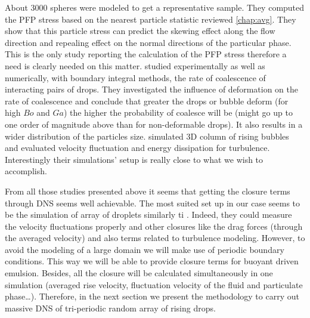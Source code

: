 About 3000 spheres were modeled to get a representative sample. 
They computed the PFP stress based on the nearest particle statistic reviewed \ref{chap:avg}.
They show that this particle stress can predict the skewing effect along the flow direction and repealing effect on the normal directions of the particular phase. 
This is the only study reporting the calculation of the PFP stress therefore a need is clearly needed on this matter.
\citet{manga1995collective} studied experimentally as well as numerically, with boundary integral methods, the rate of coalescence of interacting pairs of drops.
They investigated the influence of deformation on the rate of coalescence and conclude that greater the drops or bubble deform (for high $Bo$ and  $Ga$) the higher the probability of coalesce will be (might go up to one order of magnitude above than for non-deformable drops).
It also results in a wider distribution of the particles size.
\citet{innocenti2020direct} simulated 3D column of rising bubbles and evaluated velocity fluctuation and energy dissipation for turbulence. 
Interestingly their simulations'  setup is really close to what we wish to accomplish. 


From all those studies presented above it seems that getting the closure terms through DNS seems well achievable.
The most suited set up in our case seems to be the simulation of array of droplets similarly ti \citet{innocenti2020direct}.
Indeed, they could measure the velocity fluctuations properly and other closures like the drag forces (through the averaged velocity) and also terms related to turbulence modeling. 
However, to avoid the modeling of a large domain we will make use of periodic boundary conditions.
This way we will be able to provide closure terms for buoyant driven emulsion.
Besides, all the closure will be calculated simultaneously in one simulation (averaged rise velocity, fluctuation velocity of the fluid and particulate phase\ldots). 
Therefore, in the next section we present the methodology to carry out massive DNS of tri-periodic random array of rising drops.


